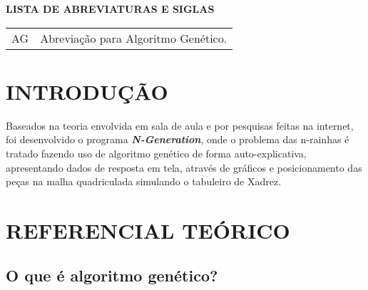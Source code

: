 \documentclass[12pt,a4paper]{article}
\begin{document}
\newpage
\thispagestyle{empty}

\begin{center}
{\large \textbf{LISTA DE ABREVIATURAS E SIGLAS}}
\end{center}

\vspace{3cm}

\begin{tabular}{ l l }
AG\hspace{1.5cm} & Abreviação para Algoritmo Genético.\\
\end{tabular}


\newpage
\thispagestyle{empty}

\begin{center}
\listoffigures
\end{center}



\newpage
\thispagestyle{empty}
\begin{center}
\tableofcontents
\end{center}

\newpage
\thispagestyle{main}

\section{INTRODUÇÃO}


\hspace{4ex}Baseados na teoria envolvida em sala de aula e por pesquisas feitas na internet, foi desenvolvido o programa \textbf{\emph{N-Generation}}, onde o problema das n-rainhas é tratado fazendo uso de algoritmo genético de forma auto-explicativa, apresentando dados de resposta em tela, através de gráficos e posicionamento das peças na malha quadriculada simulando o tabuleiro de Xadrez.


\newpage
\thispagestyle{main}

\section{REFERENCIAL TEÓRICO}

\subsection{O que é algoritmo genético?}
\end{document}
